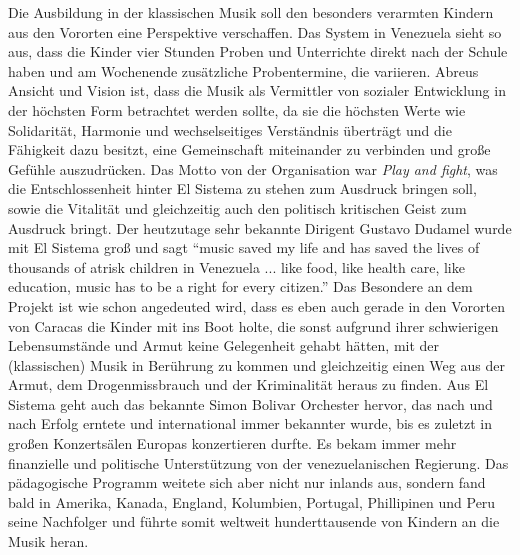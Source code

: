 Die Ausbildung in der klassischen Musik soll den besonders verarmten Kindern aus
den Vororten eine Perspektive verschaffen. Das System in Venezuela sieht so aus,
dass die Kinder vier Stunden Proben und Unterrichte direkt nach der Schule haben
und am Wochenende zusätzliche Probentermine, die variieren. Abreus Ansicht und
Vision ist, dass die Musik als Vermittler von sozialer Entwicklung in der
höchsten Form betrachtet werden sollte, da sie die höchsten Werte wie
Solidarität, Harmonie und wechselseitiges Verständnis überträgt und die
Fähigkeit dazu besitzt, eine Gemeinschaft miteinander zu verbinden und große
Gefühle auszudrücken. Das Motto von der Organisation war \emph{Play and fight},
was die Entschlossenheit hinter El Sistema zu stehen zum Ausdruck bringen
soll, sowie die Vitalität und gleichzeitig auch den politisch kritischen Geist
zum Ausdruck bringt. Der heutzutage sehr bekannte Dirigent Gustavo Dudamel wurde
mit El Sistema groß und sagt \enquote{music saved my life and has saved the lives of
thousands of atrisk children in Venezuela ... like food, like health care, like
education, music has to be a right for every
citizen.}\autocite{wikipedia:el_sistema}
Das Besondere an dem Projekt ist wie schon angedeuted wird, dass es eben auch
gerade in den Vororten von Caracas die Kinder mit ins Boot holte, die sonst
aufgrund ihrer schwierigen Lebensumstände und Armut keine Gelegenheit gehabt
hätten, mit der (klassischen) Musik in Berührung zu kommen und gleichzeitig
einen Weg aus der Armut, dem Drogenmissbrauch und der Kriminalität heraus zu
finden. Aus El Sistema geht auch das bekannte Simon Bolivar Orchester hervor,
das nach und nach Erfolg erntete und international immer bekannter wurde, bis es
zuletzt in großen Konzertsälen Europas konzertieren durfte. Es bekam immer
mehr finanzielle und politische Unterstützung von der venezuelanischen Regierung. Das
pädagogische Programm weitete sich aber nicht nur inlands aus, sondern fand bald
in Amerika, Kanada, England, Kolumbien, Portugal, Phillipinen und Peru seine
Nachfolger und führte somit weltweit hunderttausende von Kindern an die Musik
heran. 

